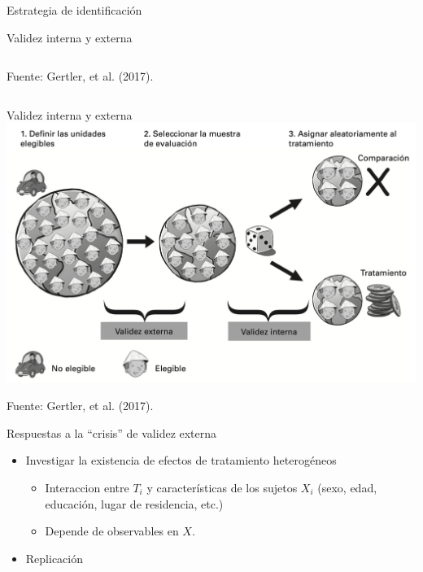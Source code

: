\documentclass[
  ignorenonframetext,
]{beamer}
\providecommand{\tightlist}{%
  \setlength{\itemsep}{0pt}\setlength{\parskip}{0pt}}
\begin{document}
\begin{frame}{Estrategia de identificación}
\begin{frame}{Validez interna y externa}
\begin{columns}
\begin{column}{0.6\textwidth}
\begin{tiny}
Fuente: Gertler, et al. (2017).
\end{tiny}

\end{column}
\end{columns}
\end{frame}

\begin{frame}{Validez interna y externa}
\protect\hypertarget{validez-interna-y-externa-1}{}
\includegraphics{figs/vive2.png}

\begin{tiny}
Fuente: Gertler, et al. (2017).
\end{tiny}
\end{frame}

\begin{frame}{Respuestas a la ``crisis'' de validez externa}
\protect\hypertarget{respuestas-a-la-crisis-de-validez-externa}{}
\begin{itemize}
\tightlist
\item
  Investigar la existencia de efectos de tratamiento heterogéneos

  \begin{itemize}
  \tightlist
  \item
    Interaccion entre \(T_i\) y características de los sujetos \(X_i\)
    (sexo, edad, educación, lugar de residencia, etc.)
  \item
    Depende de observables en \(X\). \pause \vspace{16pt}
  \end{itemize}
\item
  Replicación
\end{itemize}
\end{frame}


\end{frame}
\end{document}
